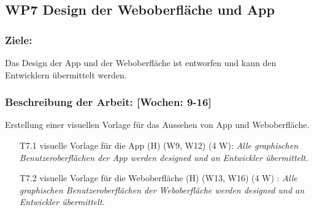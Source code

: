 \documentclass{scrreprt}
\begin{document}
\subsection*{WP7 Design der Weboberfläche und App}

\subsubsection{Ziele:} Das Design der App und der Weboberfläche ist entworfen und kann den Entwicklern übermittelt werden.
\subsubsection{Beschreibung der Arbeit: [Wochen: 9-16]} Erstellung einer visuellen Vorlage für das Aussehen von App und Weboberfläche. 

\begin{enumerate}
\item [T7.1] visuelle Vorlage für die App (H) (W9, W12) (4 W): \emph{ Alle graphischen Benutzeroberflächen der App werden designed und an Entwickler übermittelt.}
\item [T7.2] visuelle Vorlage für die Weboberfläche (H) (W13, W16) (4 W) : \emph{ Alle graphischen Benutzeroberflächen der Weboberfläche werden designed und an Entwickler übermittelt.}
\end{enumerate}



\newpage
\end{document}

